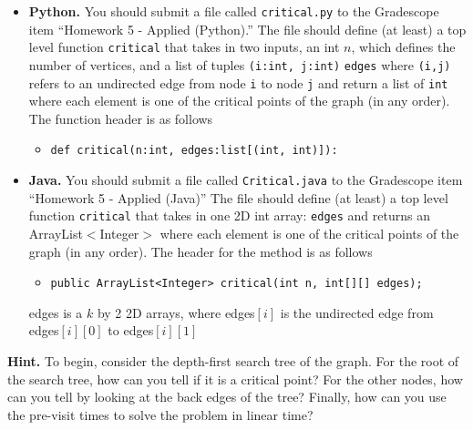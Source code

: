\documentclass[11pt]{article}
\begin{document}
\begin{itemize}
	\item \textbf{Python.} You should submit a file called \texttt{critical.py} to the Gradescope item ``Homework 5 - Applied (Python).'' The file should define (at least) a top level function \texttt{critical} that takes in two inputs, an int $n$, which defines the number of vertices, and a list of tuples \texttt{(i:int, j:int)} \texttt{edges} where \texttt{(i,j)} refers to an undirected edge from node \texttt{i} to node \texttt{j} and return a list of \texttt{int} where each element is one of the critical points of the graph (in any order). The function header is as follows
    \begin{itemize}
        \item \texttt{def critical(n:int, edges:list[(int, int)]):}
    \end{itemize}
	
    \item \textbf{Java.} You should submit a file called \texttt{Critical.java} to the Gradescope item ``Homework 5 - Applied (Java)'' The file should define (at least) a top level function \texttt{critical} that takes in one 2D int array: \texttt{edges} and returns an ArrayList$<$Integer$>$ where each element is one of the critical points of the graph (in any order). The header for the method is as follows
    \begin{itemize}
        \item \texttt{public ArrayList<Integer> critical(int n, int[][] edges);}
    \end{itemize}
    edges is a $k$ by 2 2D arrays, where edges$[i]$ is the undirected edge from edges$[i][0]$ to edges$[i][1]$

\end{itemize}

\textbf{Hint.} To begin, consider the depth-first search tree of the graph. For the root of the search tree, how can you tell if it is a critical point? For the other nodes, how can you tell by looking at the back edges of the tree? Finally, how can you use the pre-visit times to solve the problem in linear time?
\end{document}
